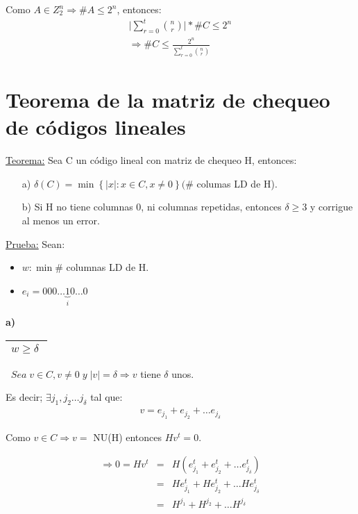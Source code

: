 \documentclass[12pt,a4paper]{report}
\newcounter{neq}
\begin{document}
			\par Como $A \in Z_{2}^{n} \Rightarrow \# A \leq 2^{n}$, entonces:
			\begin{eqnarray}
				\nonumber \lvert \sum_{r = 0}^{t} {n \choose r} \rvert * \# C \leq 2^{n} \\
				\nonumber \Rightarrow \# C \leq \frac{2^{n}}{\sum_{r = 0}^{t} {n \choose r}}
			\end{eqnarray}


	\section{Teorema de la matriz de chequeo de códigos lineales}

		\underline{Teorema:} Sea C un código lineal con matriz de chequeo H, entonces:
		\begin{itemize}
			\item[a)] $\delta(C) = \min \left\lbrace \lvert x \rvert : x \in C , x \neq 0 \right\rbrace (\#$ columas LD de H).
			\item[b)] Si H no tiene columnas 0, ni columnas repetidas, entonces $\delta \geq 3$ y corrigue al menos un error.
		\end{itemize}

		\underline{Prueba:} Sean:
		\begin{itemize}
			\item $w : \min \#$ columnas LD de H.
			\item $e_{i} = 000 \dotsc \underbrace{1}_{i} 0 \dotsc 0$
		\end{itemize}

		\textbf{a)} \begin{tabular}{|c|} \hline $w \geq \delta \; $ \\ \hline \end{tabular} $ \; \; Sea \; v \in C , v \neq 0 \; y \; \lvert v \rvert = \delta \Rightarrow v$ tiene $\delta$ unos.

		\vspace{3mm}
		Es decir; $\exists j_{1}, j_{2} \dotsc j_{\delta}$ tal que:
		\begin{eqnarray}
			\nonumber v = e_{j_{1}} + e_{j_{2}} + \dotsc e_{j_{\delta}}
		\end{eqnarray}

		Como $ v \in C \Rightarrow v =$ NU(H) entonces $Hv^{t} = 0$.

		\begin{eqnarray}
			\nonumber \Rightarrow 0 = Hv^{t} &=& H(e_{j_{1}}^{t} + e_{j_{2}}^{t} + \dotsc e_{j_{\delta}}^{t}) \\
			\nonumber &=& H e_{j_{1}}^{t} + H e_{j_{2}}^{t} + \dotsc H e_{j_{\delta}}^{t} \\
			\nonumber &=& H^{j_{1}} + H^{j_{2}} + \dotsc H^{j_{\delta}}
		\end{eqnarray}
\end{document}
